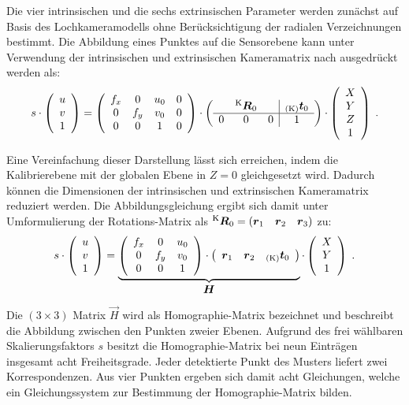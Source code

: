 Die vier intrinsischen und die sechs extrinsischen Parameter werden zunächst auf Basis des Lochkameramodells ohne Berücksichtigung der radialen Verzeichnungen bestimmt. Die Abbildung eines Punktes auf die Sensorebene kann unter Verwendung der intrinsischen und extrinsischen Kameramatrix nach  ausgedrückt werden als:
%
\begin{equation}
s \cdot 
\mat{c}{
u\\
v\\
1
}
=
\mat{cccc}{
f_x & 0 & u_\ind{0} & 0\\
0 & f_y & v_\ind{0} & 0\\
0 & 0 & 1 & 0
}
\cdot
\mat{ccc|c}{
  & \rmat{K}{0} &   & \ve{K}{t}_{\ind{0}} \\
\hline
0 &      0      & 0 & 1 \\
}
\cdot
\mat{c}{
X\\
Y\\
Z\\
1
} \; \text{.}
\end{equation}

Eine Vereinfachung dieser Darstellung lässt sich erreichen, indem die Kalibrierebene mit der globalen Ebene in $Z=0$ gleichgesetzt wird. Dadurch können die Dimensionen der intrinsischen und extrinsischen Kameramatrix reduziert werden. Die Abbildungsgleichung ergibt sich damit unter Umformulierung der Rotations-Matrix als $\rmat{K}{0} = (\vec{r}_1 \quad \vec{r}_2 \quad \vec{r}_3)$ zu:
%
%
%
\begin{equation}
s \cdot
\mat{c}{
u\\
v\\
1
}
 = 
\underbrace{
\mat{ccc}{ 
	f_x & 0 & u_\ind{0}\\
	0 & f_y & v_\ind{0}\\
	0 & 0 & 1
}
\cdot
\mat{ccc}{ 
	\vec{r}_1 & \vec{r}_2 & \ve{K}{t}_{\ind{0}} \\
}
}_{\vec{H}}
\cdot
\mat{c}{
	X\\
	Y\\
	1
} \; \text{.}
\end{equation}



Die $(3 \times 3)$ Matrix $\vec{H}$ wird als Homographie-Matrix bezeichnet und beschreibt die Abbildung zwischen den Punkten zweier Ebenen. Aufgrund des frei wählbaren Skalierungsfaktors $s$ besitzt die Homographie-Matrix bei neun Einträgen insgesamt acht Freiheitsgrade. Jeder detektierte Punkt des Musters liefert zwei Korrespondenzen. Aus vier Punkten ergeben sich damit acht Gleichungen, welche ein Gleichungssystem zur Bestimmung der Homographie-Matrix bilden.\\

